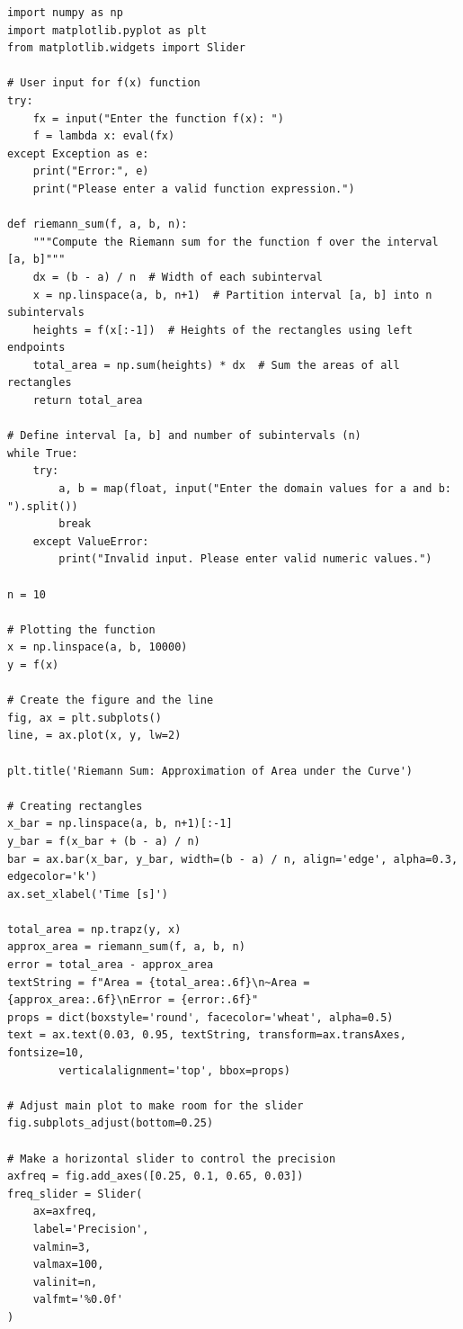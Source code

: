\documentclass[13pt,a4paper]{report}
\begin{document}
\begin{verbatim}
import numpy as np
import matplotlib.pyplot as plt
from matplotlib.widgets import Slider

# User input for f(x) function
try:
    fx = input("Enter the function f(x): ")
    f = lambda x: eval(fx)
except Exception as e:
    print("Error:", e)
    print("Please enter a valid function expression.")

def riemann_sum(f, a, b, n):
    """Compute the Riemann sum for the function f over the interval [a, b]"""
    dx = (b - a) / n  # Width of each subinterval
    x = np.linspace(a, b, n+1)  # Partition interval [a, b] into n subintervals
    heights = f(x[:-1])  # Heights of the rectangles using left endpoints
    total_area = np.sum(heights) * dx  # Sum the areas of all rectangles
    return total_area

# Define interval [a, b] and number of subintervals (n)
while True:
    try:
        a, b = map(float, input("Enter the domain values for a and b: ").split())
        break
    except ValueError:
        print("Invalid input. Please enter valid numeric values.")
        
n = 10

# Plotting the function
x = np.linspace(a, b, 10000)
y = f(x)

# Create the figure and the line
fig, ax = plt.subplots()
line, = ax.plot(x, y, lw=2)

plt.title('Riemann Sum: Approximation of Area under the Curve')

# Creating rectangles
x_bar = np.linspace(a, b, n+1)[:-1]
y_bar = f(x_bar + (b - a) / n)
bar = ax.bar(x_bar, y_bar, width=(b - a) / n, align='edge', alpha=0.3, edgecolor='k')
ax.set_xlabel('Time [s]')

total_area = np.trapz(y, x)
approx_area = riemann_sum(f, a, b, n)
error = total_area - approx_area
textString = f"Area = {total_area:.6f}\n~Area = {approx_area:.6f}\nError = {error:.6f}"
props = dict(boxstyle='round', facecolor='wheat', alpha=0.5)
text = ax.text(0.03, 0.95, textString, transform=ax.transAxes, fontsize=10,
        verticalalignment='top', bbox=props)

# Adjust main plot to make room for the slider
fig.subplots_adjust(bottom=0.25)

# Make a horizontal slider to control the precision
axfreq = fig.add_axes([0.25, 0.1, 0.65, 0.03])
freq_slider = Slider(
    ax=axfreq,
    label='Precision',
    valmin=3,
    valmax=100,
    valinit=n,
    valfmt='%0.0f'
)


\end{verbatim}
\end{document}
